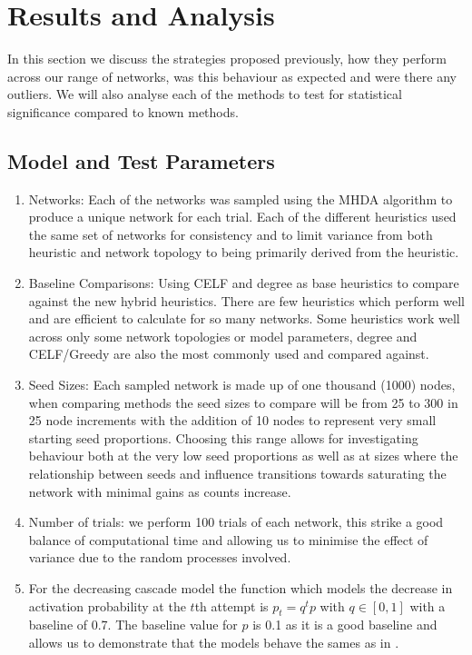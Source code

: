 \documentclass{article}
\begin{document}
\clearpage
\section{Results and Analysis}
In this section we discuss the strategies proposed previously, how they perform across our range of networks, was this behaviour as expected and were there any outliers.
We will also analyse each of the methods to test for statistical significance compared to known methods.

\subsection{Model and Test Parameters}
\begin{enumerate}
	\item Networks: Each of the networks was sampled using the MHDA algorithm to produce a unique network for each trial. Each of the different heuristics used the same set of networks for consistency and to limit variance from both heuristic and network topology to being primarily derived from the heuristic.
	\item Baseline Comparisons: Using CELF and degree as base heuristics to compare against the new hybrid heuristics. There are few heuristics which perform well and are efficient to calculate for so many networks. Some heuristics work well across only some network topologies or model parameters, degree and CELF/Greedy are also the most commonly used and compared against.
	\item Seed Sizes: Each sampled network is made up of one thousand (1000) nodes, when comparing methods the seed sizes to compare will be from 25 to 300 in 25 node increments with the addition of 10 nodes to represent very small starting seed proportions. Choosing this range allows for investigating behaviour both at the very low seed proportions as well as at sizes where the relationship between seeds and influence transitions towards saturating the network with minimal gains as counts increase.
	\item Number of trials: we perform 100 trials of each network, this strike a good balance of computational time and allowing us to minimise the effect of variance due to the random processes involved.
	\item For the decreasing cascade model the function which models the decrease in activation probability at the $t$th attempt is $p_t = q^tp$ with $q\in [0,1]$ with a baseline of 0.7. The baseline value for $p$ is 0.1 as it is a good baseline and allows us to demonstrate that the models behave the sames as in \cite{tardoskempe2003}.
\end{enumerate}
\end{document}
